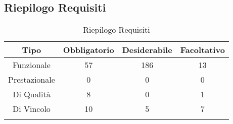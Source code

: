 \subsection{Riepilogo Requisiti}
\normalsize
\begin{longtable}{|c|c|c|c|}
\hline 
\textbf{Tipo} & \textbf{Obbligatorio} & \textbf{Desiderabile} & \textbf{Facoltativo}\\
\hline
Funzionale & 57 & 186 & 13\\ \hline
Prestazionale & 0 & 0 & 0\\ \hline
Di Qualità & 8 & 0 & 1\\ \hline
Di Vincolo & 10 & 5 & 7\\ \hline
\caption[Riepilogo Requisiti]{Riepilogo Requisiti}
\label{tabella:riepilogorequi}
\end{longtable}
\clearpage
